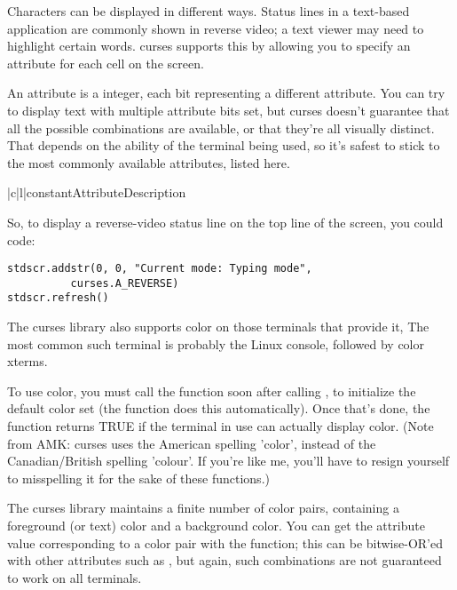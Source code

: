 \documentclass{howto}
\begin{document}
Characters can be displayed in different ways.  Status lines in a
text-based application are commonly shown in reverse video; a text
viewer may need to highlight certain words.  curses supports this by
allowing you to specify an attribute for each cell on the screen.

An attribute is a integer, each bit representing a different
attribute.  You can try to display text with multiple attribute bits
set, but curses doesn't guarantee that all the possible combinations
are available, or that they're all visually distinct.  That depends on
the ability of the terminal being used, so it's safest to stick to the
most commonly available attributes, listed here.

\begin{tableii}{|c|l|}{constant}{Attribute}{Description}
\end{tableii}

So, to display a reverse-video status line on the top line of the
screen,
you could code:

\begin{verbatim}
stdscr.addstr(0, 0, "Current mode: Typing mode",
	      curses.A_REVERSE)
stdscr.refresh()
\end{verbatim}

The curses library also supports color on those terminals that
provide it, The most common such terminal is probably the Linux
console, followed by color xterms.

To use color, you must call the  function
soon after calling , to initialize the default
color set (the  function does this
automatically).  Once that's done, the 
function returns TRUE if the terminal in use can actually display
color.  (Note from AMK:  curses uses the American spelling
'color', instead of the Canadian/British spelling 'colour'.  If you're
like me, you'll have to resign yourself to misspelling it for the sake
of these functions.)

The curses library maintains a finite number of color pairs,
containing a foreground (or text) color and a background color.  You
can get the attribute value corresponding to a color pair with the
 function; this can be bitwise-OR'ed with other
attributes such as , but again, such combinations
are not guaranteed to work on all terminals.
\end{document}
